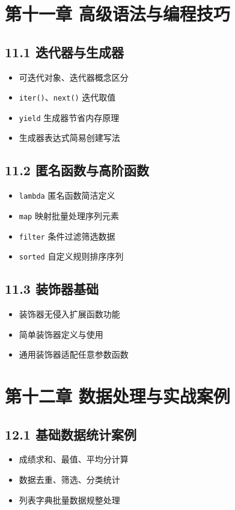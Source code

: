 \section{第十一章 高级语法与编程技巧}
\subsection{11.1 迭代器与生成器}
\begin{itemize}
\item 可迭代对象、迭代器概念区分
\item \texttt{iter()}、\texttt{next()} 迭代取值
\item \texttt{yield} 生成器节省内存原理
\item 生成器表达式简易创建写法
\end{itemize}

\subsection{11.2 匿名函数与高阶函数}
\begin{itemize}
\item \texttt{lambda} 匿名函数简洁定义
\item \texttt{map} 映射批量处理序列元素
\item \texttt{filter} 条件过滤筛选数据
\item \texttt{sorted} 自定义规则排序序列
\end{itemize}

\subsection{11.3 装饰器基础}
\begin{itemize}
\item 装饰器无侵入扩展函数功能
\item 简单装饰器定义与使用
\item 通用装饰器适配任意参数函数
\end{itemize}

\section{第十二章 数据处理与实战案例}
\subsection{12.1 基础数据统计案例}
\begin{itemize}
\item 成绩求和、最值、平均分计算
\item 数据去重、筛选、分类统计
\item 列表字典批量数据规整处理
\end{itemize}

